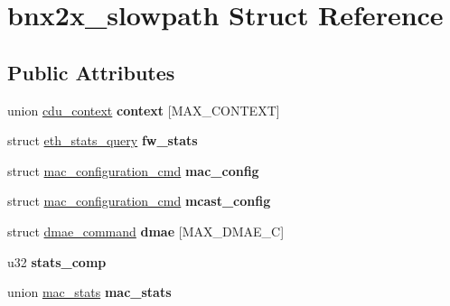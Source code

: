 \hypertarget{structbnx2x__slowpath}{
\section{bnx2x\_\-slowpath Struct Reference}
\label{structbnx2x__slowpath}
}
\subsection*{Public Attributes}
\begin{DoxyCompactItemize}
\item 
\hypertarget{structbnx2x__slowpath_ac085387dd96c0421fa923a221c436dce}{
union \hyperlink{unioncdu__context}{cdu\_\-context} {\bfseries context} \mbox{[}MAX\_\-CONTEXT\mbox{]}}
\label{structbnx2x__slowpath_ac085387dd96c0421fa923a221c436dce}

\item 
\hypertarget{structbnx2x__slowpath_a4ba536507b0b6dfab74b4c7711081e61}{
struct \hyperlink{structeth__stats__query}{eth\_\-stats\_\-query} {\bfseries fw\_\-stats}}
\label{structbnx2x__slowpath_a4ba536507b0b6dfab74b4c7711081e61}

\item 
\hypertarget{structbnx2x__slowpath_ac2ff420a2da98dc6f4bfb05cdba83584}{
struct \hyperlink{structmac__configuration__cmd}{mac\_\-configuration\_\-cmd} {\bfseries mac\_\-config}}
\label{structbnx2x__slowpath_ac2ff420a2da98dc6f4bfb05cdba83584}

\item 
\hypertarget{structbnx2x__slowpath_a913259b952fab8c0d55e87672b8e440a}{
struct \hyperlink{structmac__configuration__cmd}{mac\_\-configuration\_\-cmd} {\bfseries mcast\_\-config}}
\label{structbnx2x__slowpath_a913259b952fab8c0d55e87672b8e440a}

\item 
\hypertarget{structbnx2x__slowpath_a7cda647583f3eecd8b042a524e99eca2}{
struct \hyperlink{structdmae__command}{dmae\_\-command} {\bfseries dmae} \mbox{[}MAX\_\-DMAE\_\-C\mbox{]}}
\label{structbnx2x__slowpath_a7cda647583f3eecd8b042a524e99eca2}

\item 
\hypertarget{structbnx2x__slowpath_a981c203878e27829dc58ca52b7bb101a}{
u32 {\bfseries stats\_\-comp}}
\label{structbnx2x__slowpath_a981c203878e27829dc58ca52b7bb101a}

\item 
\hypertarget{structbnx2x__slowpath_a48370fd154acf90ff9ca387308e30328}{
union \hyperlink{unionmac__stats}{mac\_\-stats} {\bfseries mac\_\-stats}}
\label{structbnx2x__slowpath_a48370fd154acf90ff9ca387308e30328}


\end{DoxyCompactItemize}
